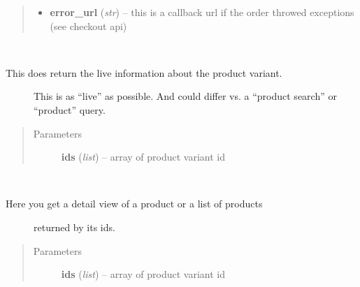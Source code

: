 \documentclass[letterpaper,10pt,english]{sphinxmanual}
\begin{document}
\begin{fulllineitems}
\begin{fulllineitems}
\begin{quote}
\begin{description}
\begin{itemize}
\item {} 
\textbf{error\_url} (\emph{str}) -- this is a callback url if the order throwed exceptions (see checkout api)

\end{itemize}

\end{description}\end{quote}

\end{fulllineitems}


\begin{fulllineitems}
\label{collins:collins.Collins.livevariant}~\begin{description}
\item[{This does return the live information about the product variant. }] \leavevmode
This is as ``live'' as possible.
And could differ vs. a ``product search'' or ``product'' query.

\end{description}
\begin{quote}\begin{description}
\item[{Parameters}] \leavevmode
\textbf{ids} (\emph{list}) -- array of product variant id

\end{description}\end{quote}

\end{fulllineitems}


\begin{fulllineitems}
\label{collins:collins.Collins.products}~\begin{description}
\item[{Here you get a detail view of a product or a list of products }] \leavevmode
returned by its ids.

\end{description}
\begin{quote}\begin{description}
\item[{Parameters}] \leavevmode
\textbf{ids} (\emph{list}) -- array of product variant id

\end{description}\end{quote}


\end{fulllineitems}
\end{fulllineitems}
\end{document}
